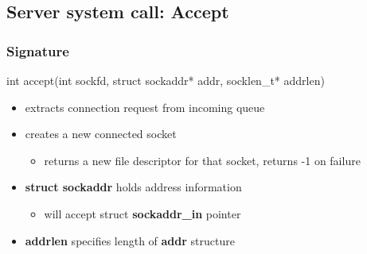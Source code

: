 \documentclass{report}
\begin{document}
    \bigbreak \noindent 
    \subsection{Server system call: Accept}
    \bigbreak \noindent 
    \subsubsection{Signature}
    \bigbreak \noindent 
    \begin{cppcode}
    int accept(int sockfd, struct sockaddr* addr, socklen_t* addrlen)
    \end{cppcode}
    \bigbreak \noindent 
    \begin{itemize}
        \item extracts connection request from incoming queue
        \item creates a new connected socket
            \begin{itemize}
                \item returns a new file descriptor for that socket, returns -1 on failure
            \end{itemize}
        \item \textbf{struct sockaddr} holds address information
            \begin{itemize}
                \item will accept struct \textbf{sockaddr\_in} pointer
            \end{itemize}
        \item \textbf{addrlen} specifies length of \textbf{addr} structure
    \end{itemize}

    \bigbreak \noindent 
\end{document}
